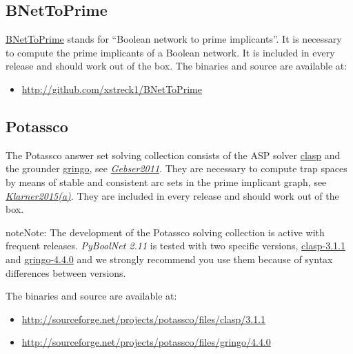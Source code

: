 \documentclass[letterpaper,10pt,english]{sphinxmanual}
\begin{document}
\subsection{BNetToPrime}
\label{Installation:bnettoprime}\label{Installation:installation-bnettoprime}
\href{https://github.com/xstreck1/BNetToPrime}{BNetToPrime} stands for ``Boolean network to prime implicants''. It is necessary to compute the prime implicants of a Boolean network. It is included in every release and should work out of the box. The binaries and source are available at:
\begin{itemize}
\item {} 
\href{http://github.com/xstreck1/BNetToPrime}{http://github.com/xstreck1/BNetToPrime}

\end{itemize}


\subsection{Potassco}
\label{Installation:installation-potassco}\label{Installation:potassco}
The Potassco answer set solving collection consists of the ASP solver \href{http://potassco.sourceforge.net/\#clasp}{clasp} and the grounder \href{http://potassco.sourceforge.net/\#gringo}{gringo}, see {\hyperref[Bibliography:gebser2011]{\emph{Gebser2011}}}.
They are necessary to compute trap spaces by means of stable and consistent arc sets in the prime implicant graph, see {\hyperref[Bibliography:klarner2015trap]{\emph{Klarner2015(a)}}}. They are included in every release and should work out of the box.

\begin{notice}{note}{Note:}
The development of the Potassco solving collection is active with frequent releases.
\emph{PyBoolNet 2.11} is tested with two specific versions, \href{https://sourceforge.net/projects/potassco/files/clasp/3.1.1}{clasp-3.1.1} and \href{https://sourceforge.net/projects/potassco/files/gringo/4.4.0}{gringo-4.4.0} and we strongly recommend you use them because of syntax differences between versions.
\end{notice}

The binaries and source are available at:
\begin{itemize}
\item {} 
\href{http://sourceforge.net/projects/potassco/files/clasp/3.1.1}{http://sourceforge.net/projects/potassco/files/clasp/3.1.1}

\item {} 
\href{http://sourceforge.net/projects/potassco/files/gringo/4.4.0}{http://sourceforge.net/projects/potassco/files/gringo/4.4.0}

\end{itemize}
\end{document}
